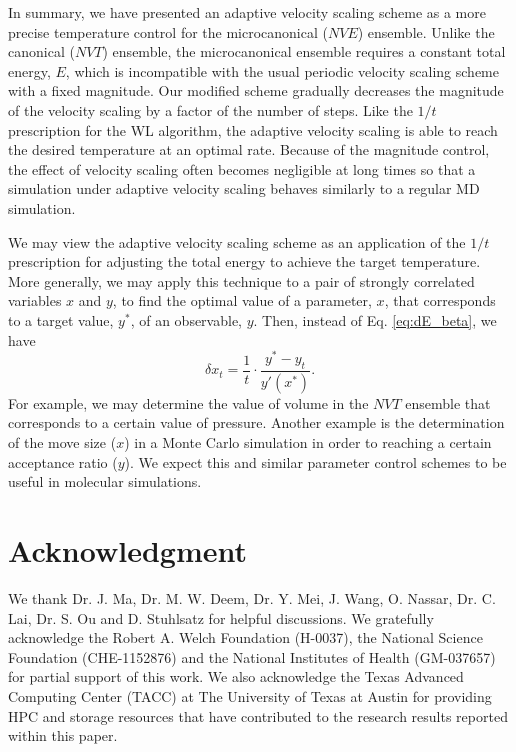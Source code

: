 \documentclass[reprint]{revtex4-1}
\begin{document}
In summary, we have presented an adaptive velocity scaling scheme
as a more precise temperature control for the microcanonical ($NVE$) ensemble.
%
Unlike the canonical ($NVT$) ensemble,
the microcanonical ensemble requires a constant total energy, $E$,
which is incompatible with the usual periodic velocity scaling scheme
with a fixed magnitude.
%
Our modified scheme gradually decreases the magnitude of the velocity scaling
by a factor of the number of steps.
%
Like the $1/t$ prescription\cite{
  belardinelli2007, *belardinelli2007jcp, *belardinelli2008,
  zhou2005, *zhou2008, *morozov2007}
for the WL algorithm\cite{wang2001, *wang2001pre},
the adaptive velocity scaling is able to reach
the desired temperature at an optimal rate.
%
Because of the magnitude control,
the effect of velocity scaling often becomes negligible
at long times so that
a simulation under adaptive velocity scaling
behaves similarly to a regular MD simulation.

We may view the adaptive velocity scaling scheme
as an application of the $1/t$ prescription
for adjusting the total energy
to achieve the target temperature.
%
More generally, we may apply this technique
to a pair of strongly correlated variables $x$ and $y$,
to find the optimal value of a parameter, $x$,
that corresponds to a target value, $y^*$, of an observable, $y$.
%
Then, instead of Eq. \eqref{eq:dE_beta},
we have
$$
\delta x_t = \frac 1 t
\cdot
\frac{ y^* - y_t }
     { y'(x^*) }
.
$$
%
For example, we may determine the value of volume in the $NVT$ ensemble
that corresponds to a certain value of pressure.
%
Another example is the determination of the
move size ($x$)
in a Monte Carlo simulation
in order to reaching a certain acceptance ratio ($y$).
%
We expect this and similar parameter control schemes
to be useful in molecular simulations.




\section{Acknowledgment}

We thank Dr. J. Ma, Dr. M. W. Deem, Dr. Y. Mei, J. Wang,
O. Nassar, Dr. C. Lai, Dr. S. Ou and D. Stuhlsatz
for helpful discussions.
We gratefully acknowledge the Robert A. Welch Foundation (H-0037),
the National Science Foundation (CHE-1152876)
and
the National Institutes of Health (GM-037657) for partial support of this work.
%
We also acknowledge the Texas Advanced Computing Center (TACC) at The University of Texas
at Austin for providing HPC and storage resources that have contributed to
the research results reported within this paper.
\end{document}
